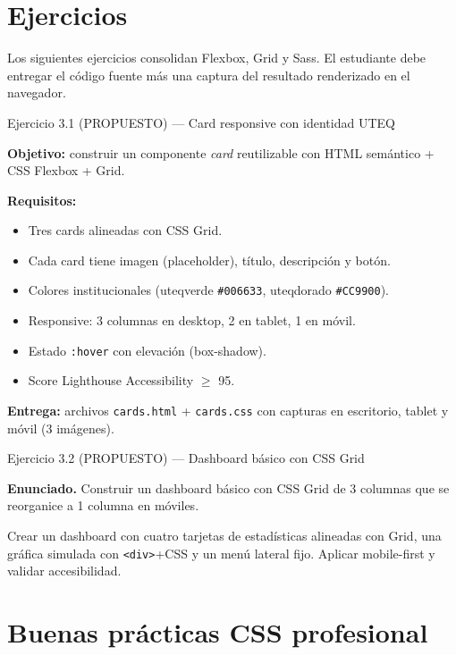 \documentclass[11pt,a4paper,openany]{book}
\begin{document}
\section{Ejercicios}

Los siguientes ejercicios consolidan Flexbox, Grid y Sass.
El estudiante debe entregar el código fuente más una captura del
resultado renderizado en el navegador.


\begin{cajaejercicio}{Ejercicio 3.1 (PROPUESTO) --- Card responsive con identidad UTEQ}

\textbf{Objetivo:} construir un componente \emph{card} reutilizable
con HTML semántico + CSS Flexbox + Grid.

\textbf{Requisitos:}
\begin{itemize}
\item Tres cards alineadas con CSS Grid.
\item Cada card tiene imagen (placeholder), título, descripción y
botón.
\item Colores institucionales (uteqverde \texttt{\#006633}, uteqdorado
\texttt{\#CC9900}).
\item Responsive: 3 columnas en desktop, 2 en tablet, 1 en móvil.
\item Estado \texttt{:hover} con elevación (box-shadow).
\item Score Lighthouse Accessibility $\geq$ 95.
\end{itemize}

\textbf{Entrega:} archivos \texttt{cards.html} + \texttt{cards.css}
con capturas en escritorio, tablet y móvil (3 imágenes).
\end{cajaejercicio}

\begin{cajaejercicio}{Ejercicio 3.2 (PROPUESTO) --- Dashboard básico con CSS Grid}


\textbf{Enunciado.} Construir un dashboard básico con CSS Grid de 3 columnas que se reorganice a 1 columna en móviles.

Crear un dashboard con cuatro tarjetas de estadísticas alineadas
con Grid, una gráfica simulada con \texttt{<div>}+CSS y un menú
lateral fijo. Aplicar mobile-first y validar accesibilidad.
\end{cajaejercicio}

\section{Buenas prácticas CSS profesional}
\end{document}
